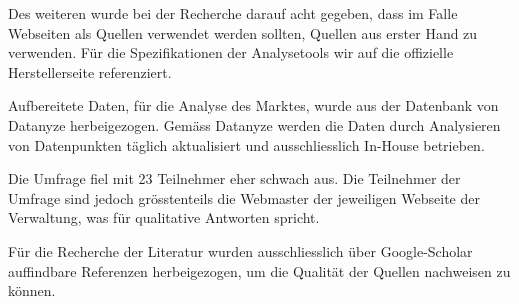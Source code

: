 Des weiteren wurde bei der Recherche darauf acht gegeben, dass im Falle Webseiten als Quellen verwendet werden sollten, Quellen aus erster Hand zu verwenden. Für die Spezifikationen der Analysetools wir auf die offizielle Herstellerseite referenziert.

Aufbereitete Daten, für die Analyse des Marktes, wurde aus der Datenbank von Datanyze \parencite{datanyzeSwitzerlandWebanalytics} herbeigezogen. Gemäss Datanyze \parencite{datanyzeFAQ} werden die Daten durch Analysieren von Datenpunkten täglich aktualisiert und ausschliesslich In-House betrieben.

Die Umfrage fiel mit 23 Teilnehmer eher schwach aus. Die Teilnehmer der Umfrage sind jedoch grösstenteils die Webmaster der jeweiligen Webseite der Verwaltung, was für qualitative Antworten spricht.

Für die Recherche der Literatur wurden ausschliesslich über Google-Scholar auffindbare Referenzen herbeigezogen, um die Qualität der Quellen nachweisen zu können.


